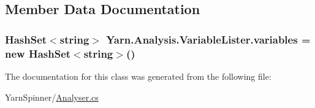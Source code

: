 \subsection{Member Data Documentation}
\hypertarget{a00163_a64ed6c3394c474b6cf5804a35f560746}{
\subsubsection[{variables}]{\setlength{\rightskip}{0pt plus 5cm}Hash\-Set$<$string$>$ Yarn.\-Analysis.\-Variable\-Lister.\-variables = new Hash\-Set$<$string$>$()\hspace{0.3cm}{\ttfamily [private]}}}\label{a00163_a64ed6c3394c474b6cf5804a35f560746}


The documentation for this class was generated from the following file\-:\begin{DoxyCompactItemize}
\item 
Yarn\-Spinner/\hyperlink{a00260}{Analyser.\-cs}\end{DoxyCompactItemize}
